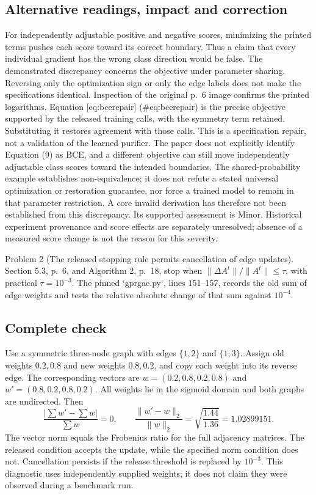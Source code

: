 \documentclass[10pt]{article}
\begin{document}
\subsection*{Alternative readings, impact and correction}
For independently adjustable positive and negative scores, minimizing the printed terms pushes each score toward its correct boundary. Thus a claim that every individual gradient has the wrong class direction would be false. The demonstrated discrepancy concerns the objective under parameter sharing. Reversing only the optimization sign or only the edge labels does not make the specifications identical. Inspection of the original p. 6 image confirms the printed logarithms. Equation [eq:bcerepair] (\#eq:bcerepair) is the precise objective supported by the released training calls, with the symmetry term retained. Substituting it restores agreement with those calls. This is a specification repair, not a validation of the learned purifier. The paper does not explicitly identify Equation (9) as BCE, and a different objective can still move independently adjustable class scores toward the intended boundaries. The shared-probability example establishes non-equivalence; it does not refute a stated universal optimization or restoration guarantee, nor force a trained model to remain in that parameter restriction. A core invalid derivation has therefore not been established from this discrepancy. Its supported assessment is Minor. Historical experiment provenance and score effects are separately unresolved; absence of a measured score change is not the reason for this severity.\par
Problem 2 (The released stopping rule permits cancellation of edge updates).  Section 5.3, p. 6, and Algorithm 2, p. 18, stop when \(\|\Delta A^t\|/\|A^t\|\leq\tau\), with practical \(\tau=10^{-3}\). The pinned `gprgae.py`, lines 151–157, records the old sum of edge weights and tests the relative absolute change of that sum against \(10^{-4}\).\par
\subsection*{Complete check}
Use a symmetric three-node graph with edges \(\{1,2\}\) and \(\{1,3\}\). Assign old weights \(0.2,0.8\) and new weights \(0.8,0.2\), and copy each weight into its reverse edge. The corresponding vectors are \(w=(0.2,0.8,0.2,0.8)\) and \(w'=(0.8,0.2,0.8,0.2)\). All weights lie in the sigmoid domain and both graphs are undirected. Then \[\frac{|\sum w'-\sum w|}{\sum w}=0,\qquad
\frac{\|w'-w\|_2}{\|w\|_2}
=\sqrt{\frac{1.44}{1.36}}=1.02899151.\] The vector norm equals the Frobenius ratio for the full adjacency matrices. The released condition accepts the update, while the specified norm condition does not. Cancellation persists if the release threshold is replaced by \(10^{-3}\). This diagnostic uses independently supplied weights; it does not claim they were observed during a benchmark run.\par
\end{document}
